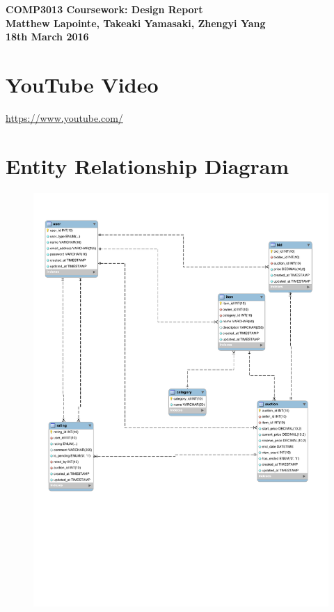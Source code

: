\documentclass{article}
\begin{document}
\begin{center}
{\LARGE\bf COMP3013 Coursework: Design Report}\\
\vspace{2mm}
{\bf Matthew Lapointe, Takeaki Yamasaki, Zhengyi Yang}\\
\vspace{1mm}
\textbf{18th March 2016}
\end{center}

\section{YouTube Video}

\url{https://www.youtube.com/}

\section{Entity Relationship Diagram}

\begin{figure}[!h]
\begin{center}
\includegraphics[scale=.65]{ERDiagram.pdf}
\end{center}
\end{figure}
\end{document}
